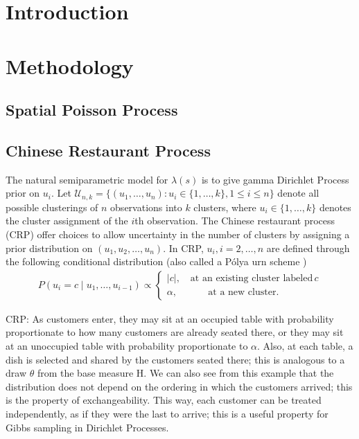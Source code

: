 \documentclass[12pt]{article}
\newcommand{\abs}[1]{\left\vert#1\right\vert}
\def\m{\mathcal}
\begin{document}
\maketitle
\begin{abstract}

\end{abstract}

\section{Introduction}\label{sec:intro}
\section{Methodology}\label{sec:method}
\subsection{Spatial Poisson Process}

\subsection{Chinese Restaurant Process }
The natural semiparametric model for $\lambda(s)$ is to give gamma Dirichlet Process prior on $u_i$. Let $\m U_{n, k} = \big\{(u_1, \ldots, u_n) : u_i \in \{1, \ldots, k\}, 1 \le i \le n \big\}$ denote all possible clusterings of $n$ observations into $k$ clusters, where $u_i \in \{1, \ldots, k\}$ denotes the cluster assignment of the $i$th observation. The Chinese restaurant process (CRP)\citep{pitman1995exchangeable, neal2000markov} offer choices to allow uncertainty in the number of clusters by assigning a prior distribution on $(u_1, u_2, \ldots, u_n)$. In CRP, $u_i, i=2, \ldots, n$ are defined through the following conditional distribution  (also called a P\'{o}lya urn scheme \cite{blackwell1973ferguson})
\begin{eqnarray}\label{eq:crp}
P(u_{i} = c \mid u_{1}, \ldots, u_{i-1})  \propto
\begin{cases}
\abs{c}  , \quad  \text{at an existing cluster labeled}\, c\\
\alpha,  \quad \quad \quad \, \text{at a new cluster}.
\end{cases}
\end{eqnarray}

	CRP: As customers enter, they may sit at an occupied table with probability proportionate to how many customers are already seated there, or they may sit at an unoccupied table with probability proportionate to $\alpha$. Also, at each table, a dish is selected and shared by the customers seated there; this is analogous to a draw $\theta$ from the base measure H. We can also see from this example that the distribution does not depend on the ordering in which the customers arrived; this is the property of exchangeability. This way, each customer can be treated independently, as if they were the last to arrive; this is a useful property for Gibbs sampling in Dirichlet Processes.
\end{document}
